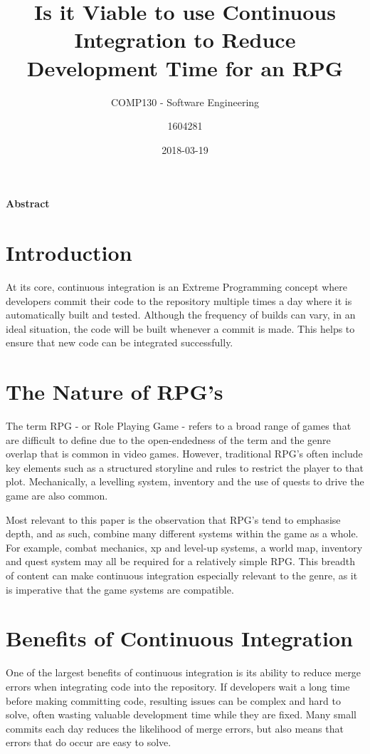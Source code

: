 \documentclass{scrartcl}
\title{Is it Viable to use Continuous Integration to Reduce Development Time for an RPG}
\subtitle{COMP130 - Software Engineering}
\date{2018-03-19}
\author{1604281}
\begin{document}
\maketitle
{}

\paragraph{Abstract}

\section{Introduction}

At its core, continuous integration is an Extreme Programming concept where developers commit their code to the repository multiple times a day where it is automatically built and tested. \cite{highwaysCI} \cite{arduinoCI} Although the frequency of builds can vary, in an ideal situation, the code will be built whenever a commit is made. This helps to ensure that new code can be integrated successfully.


\section{The Nature of RPG's}

The term RPG - or Role Playing Game - refers to a broad range of games that are difficult to define due to the open-endedness of the term and the genre overlap that is common in video games. However, traditional RPG's often include key elements such as a structured storyline and rules to restrict the player to that plot. \cite{rpgDef} Mechanically, a levelling system, inventory and the use of quests to drive the game are also common.

Most relevant to this paper is the observation that RPG's tend to emphasise depth, and as such, combine many different systems within the game as a whole. For example, combat mechanics, xp and level-up systems, a world map, inventory and quest system may all be required for a relatively simple RPG. This breadth of content can make continuous integration especially relevant to the genre, as it is imperative that the game systems are compatible.


\section{Benefits of Continuous Integration}

One of the largest benefits of continuous integration is its ability to reduce merge errors when integrating code into the repository. If developers wait a long time before making committing code, resulting issues can be complex and hard to solve, often wasting valuable development time while they are fixed. Many small commits each day reduces the likelihood of merge errors, but also means that errors that do occur are easy to solve. \cite{impactCI}
\end{document}
